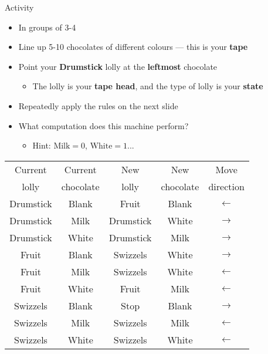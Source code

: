 \newcommand{\stateA}{Drumstick}
\newcommand{\stateB}{Fruit}
\newcommand{\stateC}{Swizzels}
\newcommand{\tapeX}{Blank}
\newcommand{\tapeO}{Milk}
\newcommand{\tapeI}{White}

\begin{frame}{Activity}
    \begin{itemize}
        \pause\item In groups of 3-4
        \pause\item Line up 5-10 chocolates of different colours --- this is your \textbf{tape}
        \pause\item Point your \textbf{\stateA} lolly at the \textbf{leftmost} chocolate
            \begin{itemize}
                \pause\item The lolly is your \textbf{tape head}, and the type of lolly is your \textbf{state}
            \end{itemize}
        \pause\item Repeatedly apply the rules on the next slide
        \pause\item What computation does this machine perform?
            \begin{itemize}
                \pause\item Hint: $\text{\tapeO}=0$, $\text{\tapeI}=1$...
            \end{itemize}
    \end{itemize}
\end{frame}

\begin{frame}
    \begin{tabular}{|cc|ccc|} \hline
        Current & Current & New & New & Move \\
        lolly & chocolate & lolly & chocolate & direction \\\hline
        \stateA & \tapeX & \stateB & \tapeX & $\leftarrow$  \\
        \stateA & \tapeO & \stateA & \tapeI & $\rightarrow$ \\
        \stateA & \tapeI & \stateA & \tapeO & $\rightarrow$ \\\hline
        \stateB & \tapeX & \stateC & \tapeI & $\rightarrow$ \\
        \stateB & \tapeO & \stateC & \tapeI & $\leftarrow$  \\
        \stateB & \tapeI & \stateB & \tapeO & $\leftarrow$  \\\hline
        \stateC & \tapeX & Stop    & \tapeX & $\rightarrow$ \\
        \stateC & \tapeO & \stateC & \tapeO & $\leftarrow$  \\
        \stateC & \tapeI & \stateC & \tapeI & $\leftarrow$  \\\hline
    \end{tabular}
\end{frame}

